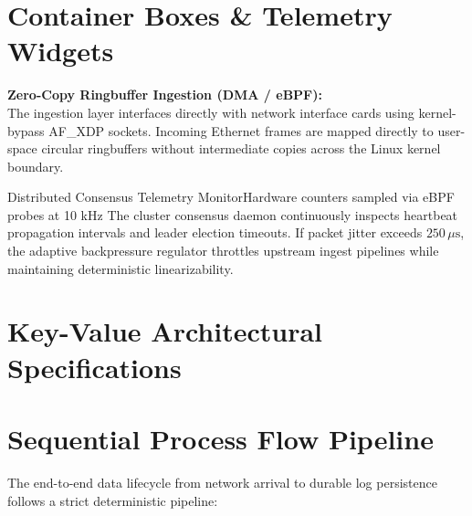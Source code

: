 \documentclass[11pt,a4paper,oneside]{report}
\begin{document}
\section{Container Boxes \& Telemetry Widgets}

\begin{leftbarbox}[accentprimary]
    \textbf{\sffamily Zero-Copy Ringbuffer Ingestion (DMA / eBPF):}\\[4pt]
    The ingestion layer interfaces directly with network interface cards using kernel-bypass AF\_XDP sockets. Incoming Ethernet frames are mapped directly to user-space circular ringbuffers without intermediate copies across the Linux kernel boundary.
\end{leftbarbox}

\begin{cardbox}{Distributed Consensus Telemetry Monitor}{Hardware counters sampled via eBPF probes at 10 kHz}
    The cluster consensus daemon continuously inspects heartbeat propagation intervals and leader election timeouts. If packet jitter exceeds $250\,\mu\text{s}$, the adaptive backpressure regulator throttles upstream ingest pipelines while maintaining deterministic linearizability.
\end{cardbox}

\section{Key-Value Architectural Specifications}



\section{Sequential Process Flow Pipeline}

The end-to-end data lifecycle from network arrival to durable log persistence follows a strict deterministic pipeline:

\begin{stepflow}
    \stepflowarrow
    \stepflowarrow
    \stepflowarrow
    \stepflowarrow
\end{stepflow}
\end{document}
